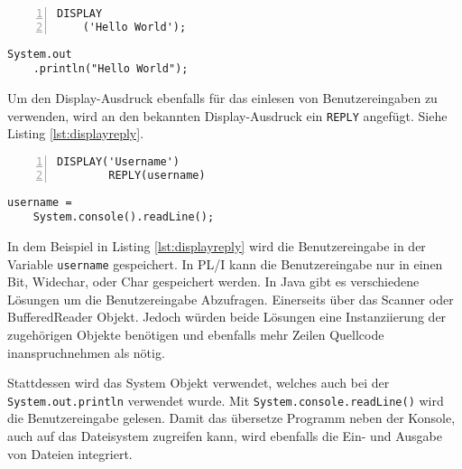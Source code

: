 \begin{minipage}[b]{0.48\linewidth}
	\centering
	\lstset{language=PL/I,label=SliceExaple}
	\begin{lstlisting}[frame=single, numbers=left, mathescape,%
		caption={Standardausgabe}, label={lst:display}]
	DISPLAY
	('Hello World');
	\end{lstlisting}
\end{minipage}
\hspace{0.5cm}
\begin{minipage}[b]{0.48\linewidth}
	\centering
	\lstset{language=Java,label=SliceExaple}
	\begin{lstlisting}[frame=single, mathescape,%
		title={" "}]
	System.out
	.println("Hello World");
	\end{lstlisting}
\end{minipage} 


Um den Display-Ausdruck ebenfalls für das einlesen von Benutzereingaben zu verwenden, wird an den bekannten Display-Ausdruck ein \verb+REPLY+ angefügt. Siehe Listing \ref{lst:displayreply}.

\begin{minipage}[b]{0.48\linewidth}
	\centering
	\lstset{language=PL/I,label=SliceExaple}
	\begin{lstlisting}[frame=single, numbers=left, mathescape,%
		caption={Standardeingabe}, label={lst:displayreply}]
		DISPLAY('Username') 
		REPLY(username)
	\end{lstlisting}
\end{minipage}
\hspace{0.5cm}
\begin{minipage}[b]{0.48\linewidth}
	\centering
	\lstset{language=Java,label=SliceExaple}
	\begin{lstlisting}[frame=single, mathescape,%
		title={" "}]
	username = 
	System.console().readLine(); 
	\end{lstlisting}
\end{minipage} 

In dem Beispiel in Listing \ref{lst:displayreply} wird die Benutzereingabe in der
Variable \verb+username+ gespeichert.
In PL/I kann die Benutzereingabe nur in einen Bit, Widechar, oder Char gespeichert
werden. 
In Java gibt es verschiedene Lösungen um die Benutzereingabe Abzufragen.
Einerseits über das Scanner oder BufferedReader Objekt.
Jedoch würden beide Lösungen eine Instanziierung der zugehörigen Objekte benötigen und ebenfalls mehr Zeilen Quellcode inanspruchnehmen als nötig.

Stattdessen wird das System Objekt verwendet, welches auch bei der \verb+System.out.println+ verwendet wurde.
Mit \verb+System.console.readLine()+ wird die Benutzereingabe gelesen.
Damit das übersetze Programm neben der Konsole, auch auf das Dateisystem zugreifen kann, wird ebenfalls die Ein- und Ausgabe von Dateien integriert.

